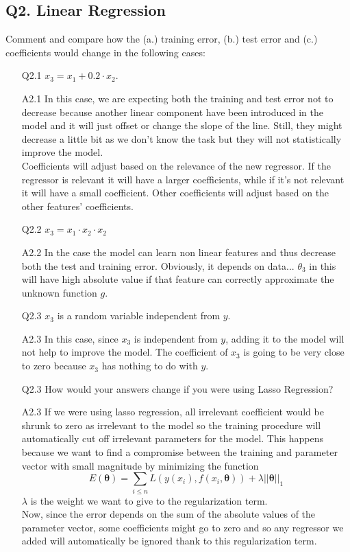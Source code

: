 \documentclass[11pt]{scrartcl}
\begin{document}
\subsection*{Q2. Linear Regression}
Comment and compare how the (a.) training error, (b.) test error and (c.) coefficients would change in the following cases:
\begin{itemize}
\item[Q2.1] $x_3 = x_1 + 0.2 \cdot x_2$.
\item[A2.1] In this case, we are expecting both the training and test error not to decrease because another linear component have been introduced in the model and it will just offset or change the slope of the line. Still, they might decrease a little bit as we don't know the task but they will not statistically improve the model. \\
Coefficients will adjust based on the relevance of the new regressor. If the regressor is relevant it will have a larger coefficients, while if it's not relevant it will have a small coefficient. Other coefficients will adjust based on the other features' coefficients.

\item[Q2.2] $x_3 = x_1 \cdot x_2 \cdot x_2$
\item[A2.2] In the case the model can learn non linear features and thus decrease both the test and training error. Obviously, it depends on data... $\theta_3$ in this will have high absolute value if that feature can correctly approximate the unknown function $g$.

\item[Q2.3] $x_3$ is a random variable independent from $y$.
\item[A2.3] In this case, since $x_3$ is independent from $y$, adding it to the model will not help to improve the model. The coefficient of $x_3$ is going to be very close to zero because $x_3$ has nothing to do with $y$.

\item[Q2.3] How would your answers change if you were using Lasso Regression?
\item[A2.3] If we were using lasso regression, all irrelevant coefficient would be shrunk to zero as irrelevant to the model so the training procedure will automatically cut off irrelevant parameters for the model. This happens because we want to find a compromise between the training and parameter vector with small magnitude by minimizing the function 
$$ E(\boldsymbol{\theta}) = \sum_{i \leq n} L(y(x_i), f(x_i, \boldsymbol{\theta})) + \lambda ||\boldsymbol{\theta}||_1$$
$\lambda$ is the weight we want to give to the regularization term.\\
Now, since the error depends on the sum of the absolute values of the parameter vector, some coefficients might go to zero and so any regressor we added will automatically be ignored thank to this regularization term.


\end{itemize}
\end{document}
